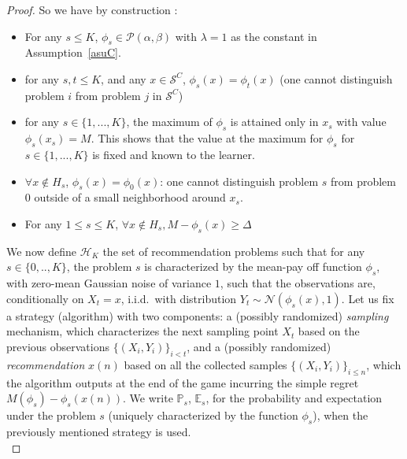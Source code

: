 \documentclass[final,12pt]{colt2018}
\begin{document}
\begin{proof}
So we have by construction :
\begin{itemize}
\item For any $s \leq K$, $\phi_s \in \mathcal{P}(\alpha,\beta)$ with $\lambda = 1$ as the constant in Assumption~\ref{asuC}.
\item for any $s,t \leq K$, and any $x \in \mathcal S^C$, $\phi_s(x) = \phi_t(x)$ (one cannot distinguish problem $i$ from problem $j$ in $\mathcal{S}^C$)
\item for any $s \in \{1, ..., K\}$, the maximum of $\phi_s$ is attained only in $x_s$ with value $\phi_s(x_s) = M$. This shows that the value at the maximum for $\phi_s$ for $s \in \{1, ..., K\}$ is fixed and known to the learner.
\item  $\forall x \not\in H_s$, $\phi_s(x) = \phi_0(x)$: one cannot distinguish problem $s$ from problem $0$ outside of a small neighborhood around $x_s$.
\item  For any $1 \leq s \leq K$, $\forall x \not\in H_s, M - \phi_s(x) \geq \Delta$
\end{itemize}


We now define $\mathcal{H}_K$ the set of recommendation problems such that for any $s \in \{0,..,K\}$, the problem $s$ is characterized by the mean-pay off function $\phi_s$, with zero-mean Gaussian noise of variance $1$, such that the observations are, conditionally on $X_t=x$,  i.i.d.~with distribution $Y_t \sim \mathcal{N}(\phi_s(x), 1)$. Let us fix a strategy (algorithm) with two components: a (possibly randomized) \emph{sampling} mechanism, which characterizes the next sampling point $X_t$ based on the previous observations $\{(X_i,Y_i)\}_{i<t}$, and a (possibly randomized) \emph{recommendation} $x(n)$ based on all the collected samples $\{(X_i,Y_i)\}_{i \leq n}$, which the algorithm outputs at the end of the game incurring the simple regret $M(\phi_s) - \phi_s(x(n))$. We write $\mathbb P_s$, $\mathbb E_s$, for the probability and expectation under the problem $s$ (uniquely characterized by the function $\phi_s$), when the previously mentioned strategy is used.\\


\end{proof}
\end{document}
